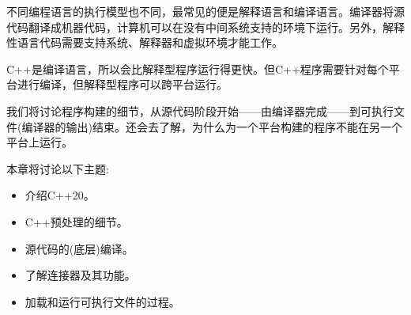 不同编程语言的执行模型也不同，最常见的便是解释语言和编译语言。编译器将源代码翻译成机器代码，计算机可以在没有中间系统支持的环境下运行。另外，解释性语言代码需要支持系统、解释器和虚拟环境才能工作。 \par
C++是编译语言，所以会比解释型程序运行得更快。但C++程序需要针对每个平台进行编译，但解释型程序可以跨平台运行。 \par
我们将讨论程序构建的细节，从源代码阶段开始——由编译器完成——到可执行文件(编译器的输出)结束。还会去了解，为什么为一个平台构建的程序不能在另一个平台上运行。 \par
本章将讨论以下主题: \par

\begin{itemize}
	\item 介绍C++20。
	\item C++预处理的细节。
	\item 源代码的(底层)编译。
	\item 了解连接器及其功能。
	\item 加载和运行可执行文件的过程。
\end{itemize}



